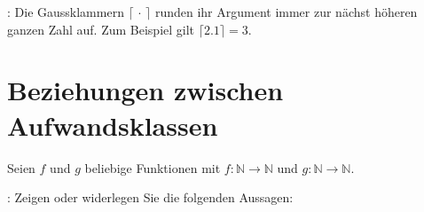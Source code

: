 \documentclass[german, solution]{acAssignment}
\begin{document}
\vspace{0.4cm}

\acNote:
Die Gaussklammern $\lceil \,\cdot\, \rceil$ runden ihr Argument immer zur nächst höheren ganzen Zahl auf.
Zum Beispiel gilt $\lceil 2.1 \rceil = 3$.


\section{Beziehungen zwischen Aufwandsklassen}

Seien $f$ und $g$ beliebige Funktionen mit $f : \mathbb{N} \to \mathbb{N}$ und $g : \mathbb{N} \to \mathbb{N}$.

:
Zeigen oder widerlegen Sie die folgenden Aussagen:
\end{document}
